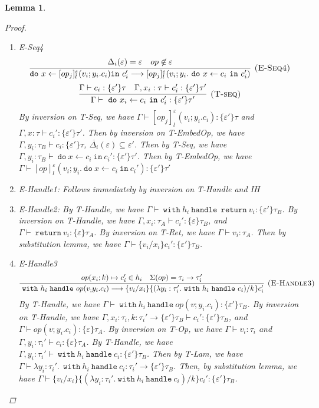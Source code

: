 \documentclass{article}
\newtheorem{lemma}[theorem]{Lemma}
\theoremstyle{definition}
\newcommand{\m}[1]{\ \texttt{#1}\ }
\begin{document}
\begin{lemma}
\begin{proof}
\begin{enumerate}
\item E-Seq4
$$
\infer[\textsc{(E-Seq4)}]
  {\texttt{do}\ x \leftarrow [op_j]^\varepsilon_l(v_i; y_i.c_i) \texttt{in}\ c_i' \longrightarrow [op_j]^\varepsilon_l(v_i; y_i. \m{do} x \leftarrow c_i \m{in} c_i')}
  {\Delta_i(\varepsilon) = \varepsilon & op \not \in \varepsilon} $$
$$
\infer[\textsc{(T-seq)}]
  {\Gamma\vdash \m{do} x_i \leftarrow c_i \m{in} c_i' : \{\varepsilon'\}\tau' }
  {\Gamma \vdash c_i : \{\varepsilon'\}\tau & \Gamma, x_i:\tau \vdash c_i': \{\varepsilon'\}\tau'}  $$
By inversion on T-Seq, we have $\Gamma \vdash [op_j]^\varepsilon_l(v_i; y_i.c_i): \{\varepsilon'\}\tau$ and $\Gamma, x:\tau \vdash c_i' : \{\varepsilon'\} \tau'$. Then by inversion on T-EmbedOp, we have $\Gamma, y_i:\tau_B \vdash c_i: \{\varepsilon'\}\tau$, $\overline{\Delta_i}(\varepsilon) \subseteq \varepsilon'$.
Then by T-Seq, we have $\Gamma, y_i:\tau_B \vdash \m{do} x \leftarrow c_i \m{in} c_i' : \{\varepsilon'\}\tau'$. Then by T-EmbedOp, we have $\Gamma \vdash [op]^\varepsilon_l(v_i; y_i.  \m{do} x \leftarrow c_i \m{in} c_i' ): \{\varepsilon'\}\tau'$

\item E-Handle1: Follows immediately by inversion on T-Handle and IH
\item E-Handle2: By T-Handle, we have $\Gamma \vdash \m{with} h_i \m{handle} \m{return} v_i :  \{\varepsilon'\}\tau_B$. By inversion on T-Handle, we have $\Gamma, x_i:\tau_A \vdash c_i' : \{\varepsilon\}\tau_B$, and $\Gamma \vdash \m{return} v_i : \{\varepsilon\} \tau_A$. By inversion on T-Ret, we have $\Gamma \vdash v_i : \tau_A$. Then by substitution lemma, we have $\Gamma \vdash \{v_i/x_i\}c_i' : \{\varepsilon'\}\tau_B$. 

\item E-Handle3
$$
\infer[\textsc{(E-Handle3)}]
  {\m{with} h_i \m{handle} op(v_; y_i.c_i) \longrightarrow \{v_i/x_i\} \{(\lambda y_i: \tau_i'.
   \m{with} h_i\m{handle} c_i) / k\}c_i' }
  {op(x_i; k) \mapsto c_i' \in h_i & \Sigma(op) = \tau_i \rightarrow \tau_i'} 
$$
By T-Handle, we have $\Gamma \vdash \m{with} h_i \m{handle} op(v;y_i.c_i) :  \{\varepsilon'\}\tau_B$. By inversion on T-Handle, we have $\Gamma, x_i:\tau_i, k: \tau_i' \rightarrow \{\varepsilon'\}\tau_B \vdash c_i' : \{\varepsilon'\} \tau_B$, and $\Gamma \vdash op(v; y_i.c_i) : \{\varepsilon\} \tau_A$. By inversion on T-Op, we have $\Gamma \vdash v_i : \tau_i$ and $\Gamma, y_i: \tau_i' \vdash c_i: \{\varepsilon\}\tau_A$. By T-Handle, we have $\Gamma, y_i: \tau_i' \vdash \m{with} h_i \m{handle} c_i : \{\varepsilon'\}\tau_B$. Then by T-Lam, we have $\Gamma \vdash \lambda y_i:\tau_i'.\ \m{with} h_i \m{handle} c_i : \tau_i' \rightarrow  \{\varepsilon'\}\tau_B$. Then, by substitution lemma, we have $\Gamma \vdash \{v_i/x_i\} \{(\lambda y_i: \tau_i'.
   \m{with} h_i\m{handle} c_i) / k\}c_i' : \{\varepsilon'\}\tau_B$.
   

\end{enumerate}
\end{proof}
\end{lemma}
\end{document}
